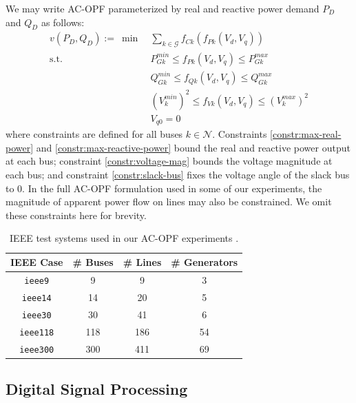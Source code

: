 \documentclass[10pt]{article} %
\theoremstyle{plain}
\theoremstyle{definition}
\theoremstyle{remark}
\begin{document}
We may write AC-OPF parameterized by real and reactive power demand $P_D$ and $Q_D$ as follows:
\begin{align}
    v(P_D, Q_D) := ~ \min~& \sum_{k \in \mathcal{G}} f_{Ck}(f_{Pk}(V_d, V_q))  \label{eq:AC-OPF} \\
    \text{s.t.}~& P_{Gk}^{min} \leq f_{Pk}(V_d, V_q) \leq P_{Gk}^{max} \label{constr:max-real-power} \\
    & Q_{Gk}^{min} \leq f_{Qk}(V_d, V_q) \leq Q_{Gk}^{max} \label{constr:max-reactive-power}\\
    & (V_{k}^{min})^2 \leq f_{Vk}(V_d, V_q) \leq (V_{k}^{max})^2 \label{constr:voltage-mag} \\
    & V_{q0} = 0 \label{constr:slack-bus}
\end{align}
where constraints are defined for all buses $k \in \mathcal{N}$. Constraints \eqref{constr:max-real-power} and \eqref{constr:max-reactive-power} bound the real and reactive power output at each bus; constraint \eqref{constr:voltage-mag} bounds the voltage magnitude at each bus; and constraint \eqref{constr:slack-bus} fixes the voltage angle of the slack bus to $0$. In the full AC-OPF formulation used in some of our experiments, the magnitude of apparent power flow on lines may also be constrained. We omit these constraints here for brevity.

{
\setlength{\tabcolsep}{15pt}
\begin{table}[t]
\centering
\caption{IEEE test systems used in our AC-OPF experiments \citep{ieeetestcases}.}
\begin{tabular}{cccc}
\toprule
\textbf{IEEE Case} & \textbf{\# Buses}&  \textbf{\# Lines} & \textbf{\# Generators} \\
\midrule
\texttt{ieee9}     & 9   & 9  & 3 \\
\texttt{ieee14}    & 14  & 20  & 5 \\
\texttt{ieee30}    & 30  & 41  & 6 \\
\texttt{ieee118}   & 118 & 186  & 54 \\
\texttt{ieee300}   & 300 & 411  & 69 \\
\bottomrule
\end{tabular}
\label{tab:ieee-description}
\end{table}
}

\subsection{Digital Signal Processing}
\end{document}
